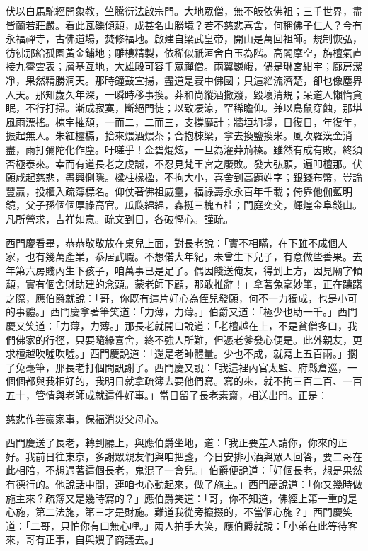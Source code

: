 伏以白馬駝經開象教，竺騰衍法啟宗門。大地眾僧，無不皈依佛祖；三千世界，盡皆蘭若莊嚴。看此瓦礫傾頹，成甚名山勝境？若不慈悲喜舍，何稱佛子仁人？今有永福禪寺，古佛道場，焚修福地。啟建自梁武皇帝，開山是萬回祖師。規制恢弘，彷彿那給孤園黃金鋪地；雕樓精製，依稀似祇洹舍白玉為階。高閣摩空，旃檀氣直接九霄雲表；層基亙地，大雄殿可容千眾禪僧。兩翼巍峨，儘是琳宮紺宇；廊房潔凈，果然精勝洞天。那時鐘鼓宣揚，盡道是寰中佛國；只這緇流濟楚，卻也像塵界人天。那知歲久年深，一瞬時移事換。莽和尚縱酒撒潑，毀壞清規；呆道人懶惰貪眠，不行打掃。漸成寂寞，斷絕門徒；以致凄涼，罕稀瞻仰。兼以鳥鼠穿蝕，那堪風雨漂搖。棟宇摧頹，一而二，二而三，支撐靡計；牆垣坍塌，日復日，年復年，振起無人。朱紅欞槅，拾來煨酒煨茶；合抱棟梁，拿去換鹽換米。風吹羅漢金消盡，雨打彌陀化作塵。吁嗟乎！金碧焜炫，一旦為灌莽荊榛。雖然有成有敗，終須否極泰來。幸而有道長老之虔誠，不忍見梵王宮之廢敗。發大弘願，遍叩檀那。伏願咸起慈悲，盡興惻隱。樑柱椽楹，不拘大小，喜舍到高題姓字；銀錢布幣，豈論豐贏，投櫃入疏簿標名。仰仗著佛祖威靈，福祿壽永永百年千載；倚靠他伽藍明鏡，父子孫個個厚祿高官。瓜瓞綿綿，森挺三槐五桂；門庭奕奕，輝煌金阜錢山。凡所營求，吉祥如意。疏文到日，各破慳心。謹疏。

西門慶看畢，恭恭敬敬放在桌兒上面，對長老說：「實不相瞞，在下雖不成個人家，也有幾萬產業，忝居武職。不想偌大年紀，未曾生下兒子，有意做些善果。去年第六房賤內生下孩子，咱萬事已是足了。偶因餞送俺友，得到上方，因見廟字傾頹，實有個舍財助建的念頭。蒙老師下顧，那敢推辭！」拿著兔毫妙筆，正在躊躇之際，應伯爵就說：「哥，你既有這片好心為侄兒發願，何不一力獨成，也是小可的事體。」西門慶拿著筆笑道：「力薄，力薄。」伯爵又道：「極少也助一千。」西門慶又笑道：「力薄，力薄。」那長老就開口說道：「老檀越在上，不是貧僧多口，我們佛家的行徑，只要隨緣喜舍，終不強人所難，但憑老爹發心便是。此外親友，更求檀越吹噓吹噓。」西門慶說道：「還是老師體量。少也不成，就寫上五百兩。」擱了兔毫筆，那長老打個問訊謝了。西門慶又說：「我這裡內官太監、府縣倉巡，一個個都與我相好的，我明日就拿疏簿去要他們寫。寫的來，就不拘三百二百、一百五十，管情與老師成就這件好事。」當日留了長老素齋，相送出門。正是：

慈悲作善豪家事，保福消災父母心。

西門慶送了長老，轉到廳上，與應伯爵坐地，道：「我正要差人請你，你來的正好。我前日往東京，多謝眾親友們與咱把盞，今日安排小酒與眾人回答，要二哥在此相陪，不想遇著這個長老，鬼混了一會兒。」伯爵便說道：「好個長老，想是果然有德行的。他說話中間，連咱也心動起來，做了施主。」西門慶說道：「你又幾時做施主來？疏簿又是幾時寫的？」應伯爵笑道：「哥，你不知道，佛經上第一重的是心施，第二法施，第三才是財施。難道我從旁攛掇的，不當個心施？」西門慶笑道：「二哥，只怕你有口無心哩。」兩人拍手大笑，應伯爵就說：「小弟在此等待客來，哥有正事，自與嫂子商議去。」

